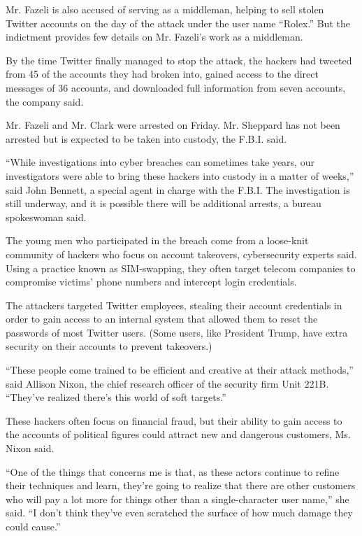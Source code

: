 Mr. Fazeli is also accused of serving as a middleman, helping to sell
stolen Twitter accounts on the day of the attack under the user name
``Rolex.'' But the indictment provides few details on Mr. Fazeli's work
as a middleman.

By the time Twitter finally managed to stop the attack, the hackers had
tweeted from 45 of the accounts they had broken into, gained access to
the direct messages of 36 accounts, and downloaded full information from
seven accounts, the company said.

Mr. Fazeli and Mr. Clark were arrested on Friday. Mr. Sheppard has not
been arrested but is expected to be taken into custody, the F.B.I. said.

``While investigations into cyber breaches can sometimes take years, our
investigators were able to bring these hackers into custody in a matter
of weeks,'' said John Bennett, a special agent in charge with the F.B.I.
The investigation is still underway, and it is possible there will be
additional arrests, a bureau spokeswoman said.

The young men who participated in the breach come from a loose-knit
community of hackers who focus on account takeovers, cybersecurity
experts said. Using a practice known as SIM-swapping, they often target
telecom companies to compromise victims' phone numbers and intercept
login credentials.

The attackers targeted Twitter employees, stealing their account
credentials in order to gain access to an internal system that allowed
them to reset the passwords of most Twitter users. (Some users, like
President Trump, have extra security on their accounts to prevent
takeovers.)

``These people come trained to be efficient and creative at their attack
methods,'' said Allison Nixon, the chief research officer of the
security firm Unit 221B. ``They've realized there's this world of soft
targets.''

These hackers often focus on financial fraud, but their ability to gain
access to the accounts of political figures could attract new and
dangerous customers, Ms. Nixon said.

``One of the things that concerns me is that, as these actors continue
to refine their techniques and learn, they're going to realize that
there are other customers who will pay a lot more for things other than
a single-character user name,'' she said. ``I don't think they've even
scratched the surface of how much damage they could cause.''

